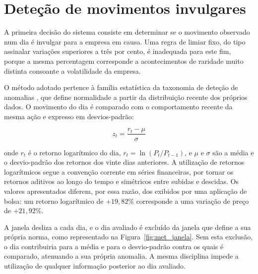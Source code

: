 \section{Deteção de movimentos invulgares}
\label{sec:met_detecao}

A primeira decisão do sistema consiste em determinar se o movimento observado num dia é invulgar
para a empresa em causa. Uma regra de limiar fixo, do tipo assinalar variações superiores a três
por cento, é inadequada para este fim, porque a mesma percentagem corresponde a acontecimentos de
raridade muito distinta consoante a volatilidade da empresa.

O método adotado pertence à família estatística da taxonomia de deteção de anomalias
\autocite{chandola2009anomaly}, que define normalidade a partir da distribuição recente dos
próprios dados. O movimento do dia é comparado com o comportamento recente da mesma ação e
expresso em desvios-padrão:

\begin{equation}
z_t = \frac{r_t - \mu}{\sigma}
\label{eq:zscore}
\end{equation}

onde $r_t$ é o retorno logarítmico do dia, $r_t = \ln(P_t / P_{t-1})$, e $\mu$ e $\sigma$ são a
média e o desvio-padrão dos retornos dos vinte dias anteriores. A utilização de retornos
logarítmicos segue a convenção corrente em séries financeiras, por tornar os retornos aditivos ao
longo do tempo e simétricos entre subidas e descidas. Os valores apresentados diferem, por essa
razão, dos exibidos por uma aplicação de bolsa: um retorno logarítmico de $+19{,}82\%$ corresponde
a uma variação de preço de $+21{,}92\%$.

A janela desliza a cada dia, e o dia avaliado é excluído da janela que define a sua própria norma,
como representado na Figura~\ref{fig:met_janela}. Sem esta exclusão, o dia contribuiria para a
média e para o desvio-padrão contra os quais é comparado, atenuando a sua própria anomalia. A
mesma disciplina impede a utilização de qualquer informação posterior ao dia avaliado.

